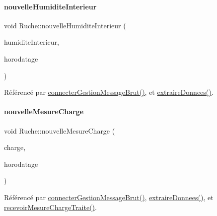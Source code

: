 \paragraph{\texorpdfstring{nouvelle\+Humidite\+Interieur}{nouvelleHumiditeInterieur}}
{\footnotesize\ttfamily void Ruche\+::nouvelle\+Humidite\+Interieur (\begin{DoxyParamCaption}\item[{Q\+String}]{humidite\+Interieur,  }\item[{Q\+String}]{horodatage }\end{DoxyParamCaption})\hspace{0.3cm}{\ttfamily [signal]}}



Référencé par \hyperlink{class_ruche_a9c8e7e3b529676c6dda3d936370af00f}{connecter\+Gestion\+Message\+Brut()}, et \hyperlink{class_ruche_a21c0dafeaec03d451590037343e6a3ca}{extraire\+Donnees()}.

\mbox{\label{class_ruche_a49ac0c627ecac39c969403db1495711f}} 
\paragraph{\texorpdfstring{nouvelle\+Mesure\+Charge}{nouvelleMesureCharge}\hspace{0.1cm}{\footnotesize\ttfamily [1/2]}}
{\footnotesize\ttfamily void Ruche\+::nouvelle\+Mesure\+Charge (\begin{DoxyParamCaption}\item[{Q\+String}]{charge,  }\item[{Q\+String}]{horodatage }\end{DoxyParamCaption})\hspace{0.3cm}{\ttfamily [signal]}}



Référencé par \hyperlink{class_ruche_a9c8e7e3b529676c6dda3d936370af00f}{connecter\+Gestion\+Message\+Brut()}, \hyperlink{class_ruche_a21c0dafeaec03d451590037343e6a3ca}{extraire\+Donnees()}, et \hyperlink{class_ruche_a4ad540139115b79cd52336ad1a11453c}{recevoir\+Mesure\+Charge\+Traite()}.

\mbox{\label{class_ruche_a3bd0a55bb10880f8753d5c2fdb41651f}} 
